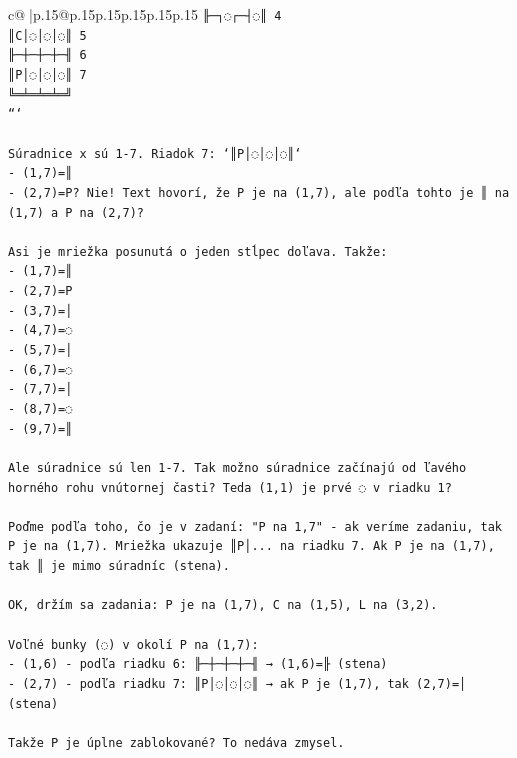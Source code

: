 \documentclass{article}
\begin{document}
{\begin{supertabular}{c@{$\;$}|p{.15\linewidth}@{}p{.15\linewidth}p{.15\linewidth}p{.15\linewidth}p{.15\linewidth}p{.15\linewidth}}
{{{\texttt{╟─┐◌┌─┤◌║ 4} \\
\texttt{║C│◌│◌│◌║ 5} \\
\texttt{╟─┼─┼─┼─╢ 6} \\
\texttt{║P│◌│◌│◌║ 7} \\
\texttt{╚═╧═╧═╧═╝} \\
\texttt{```} \\
\\ 
\texttt{Súradnice x sú 1{-}7. Riadok 7: `║P│◌│◌│◌║`} \\
\texttt{{-} (1,7)=║} \\
\texttt{{-} (2,7)=P? Nie! Text hovorí, že P je na (1,7), ale podľa tohto je ║ na (1,7) a P na (2,7)?} \\
\\ 
\texttt{Asi je mriežka posunutá o jeden stĺpec doľava. Takže:} \\
\texttt{{-} (1,7)=║} \\
\texttt{{-} (2,7)=P} \\
\texttt{{-} (3,7)=│} \\
\texttt{{-} (4,7)=◌} \\
\texttt{{-} (5,7)=│} \\
\texttt{{-} (6,7)=◌} \\
\texttt{{-} (7,7)=│} \\
\texttt{{-} (8,7)=◌} \\
\texttt{{-} (9,7)=║} \\
\\ 
\texttt{Ale súradnice sú len 1{-}7. Tak možno súradnice začínajú od ľavého horného rohu vnútornej časti? Teda (1,1) je prvé ◌ v riadku 1?} \\
\\ 
\texttt{Poďme podľa toho, čo je v zadaní: "P na 1,7" {-} ak veríme zadaniu, tak P je na (1,7). Mriežka ukazuje ║P│... na riadku 7. Ak P je na (1,7), tak ║ je mimo súradníc (stena).} \\
\\ 
\texttt{OK, držím sa zadania: P je na (1,7), C na (1,5), L na (3,2).} \\
\\ 
\texttt{Voľné bunky (◌) v okolí P na (1,7):} \\
\texttt{{-} (1,6) {-} podľa riadku 6: ╟─┼─┼─┼─╢ → (1,6)=╟ (stena)} \\
\texttt{{-} (2,7) {-} podľa riadku 7: ║P│◌│◌│◌║ → ak P je (1,7), tak (2,7)=│ (stena)} \\
\\ 
\texttt{Takže P je úplne zablokované? To nedáva zmysel. } \\
}}}
\end{supertabular}}
\end{document}
